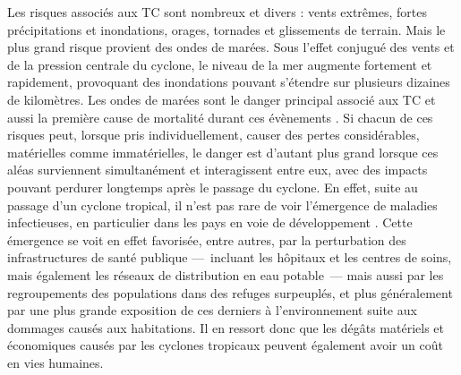 \documentclass[../main.tex]{subfiles}
\begin{document}
Les risques associés aux TC sont nombreux et divers : vents extrêmes, fortes précipitations et inondations, orages, tornades et glissements de terrain. Mais le plus grand risque provient des ondes de marées. Sous l'effet conjugué des vents et de la pression centrale du cyclone, le niveau de la mer augmente fortement et rapidement, provoquant des inondations pouvant s'étendre sur plusieurs dizaines de kilomètres. Les ondes de marées
sont le danger principal associé aux TC et aussi la première cause de mortalité durant ces évènements \parencite{needham_review_2015}. Si chacun de ces risques peut, lorsque pris individuellement, causer des pertes considérables, matérielles comme immatérielles, le danger est d'autant plus grand lorsque ces aléas surviennent simultanément et interagissent entre eux, avec des impacts pouvant perdurer longtemps après le passage du cyclone. En effet, suite au passage d'un cyclone tropical, il n'est pas rare de voir l'émergence de maladies infectieuses, en
particulier dans les pays en voie de développement \parencite{shultz_epidemiology_2005}. Cette émergence se voit en effet favorisée, entre autres, par la perturbation des infrastructures de santé publique ---~incluant les hôpitaux et les centres de soins, mais également les réseaux de distribution en eau potable~--- mais aussi par les regroupements des populations dans des refuges surpeuplés, et plus généralement par une plus grande exposition de ces derniers à l'environnement suite aux dommages causés aux
habitations. Il en ressort donc que les dégâts matériels et économiques causés par les cyclones tropicaux peuvent également avoir un coût en vies humaines.
\end{document}
